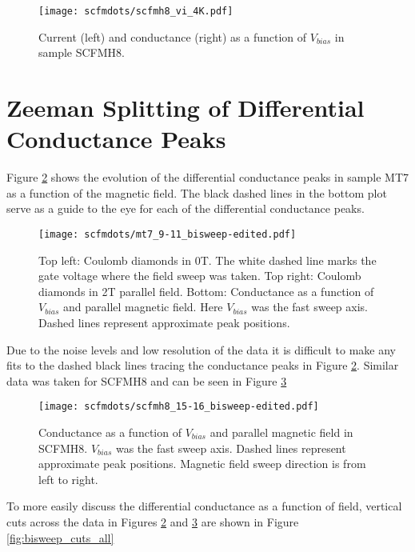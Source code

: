 \begin{figure}
    \centering
    \texttt{[image: scfmdots/scfmh8\_vi\_4K.pdf]}
    \caption{Current (left) and conductance (right) as a function of $V_{bias}$ in sample SCFMH8.}
    \label{fig:scfmh8_vi}
\end{figure}

\section{Zeeman Splitting of Differential Conductance Peaks}

Figure \ref{fig:mt7_bisweep_edit} shows the evolution of the differential conductance peaks in sample MT7 as a function of the magnetic field. The black dashed lines in the bottom plot serve as a guide to the eye for each of the differential conductance peaks.

\begin{figure}
    \centering
    \texttt{[image: scfmdots/mt7\_9-11\_bisweep-edited.pdf]}
    \caption{Top left: Coulomb diamonds in 0T. The white dashed line marks the gate voltage where the field sweep was taken. Top right: Coulomb diamonds in 2T parallel field. Bottom: Conductance as a function of $V_{bias}$ and parallel magnetic field. Here $V_{bias}$ was the fast sweep axis. Dashed lines represent approximate peak positions.}
    \label{fig:mt7_bisweep_edit}
\end{figure}

Due to the noise levels and low resolution of the data it is difficult to make any fits to the dashed black lines tracing the conductance peaks in Figure \ref{fig:mt7_bisweep_edit}. Similar data was taken for SCFMH8 and can be seen in Figure \ref{fig:scfmh8_bisweep_edit}

\begin{figure}
    \centering
    \texttt{[image: scfmdots/scfmh8\_15-16\_bisweep-edited.pdf]}
    \caption{Conductance as a function of $V_{bias}$ and parallel magnetic field in SCFMH8. $V_{bias}$ was the fast sweep axis. Dashed lines represent approximate peak positions. Magnetic field sweep direction is from left to right.}
    \label{fig:scfmh8_bisweep_edit}
\end{figure}

To more easily discuss the differential conductance as a function of field, vertical cuts across the data in Figures \ref{fig:mt7_bisweep_edit} and \ref{fig:scfmh8_bisweep_edit} are shown in Figure \ref{fig:bisweep_cuts_all}

